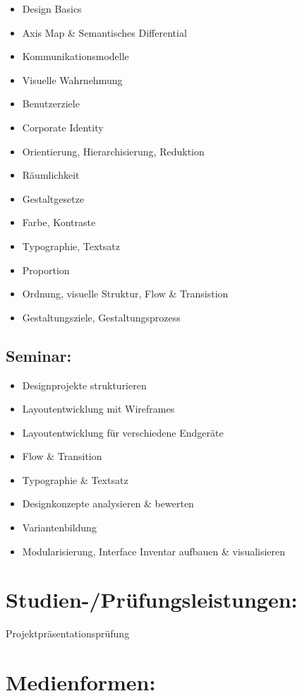 \begin{itemize}
\item
  Design Basics
\item
  Axis Map \& Semantisches Differential
\item
  Kommunikationsmodelle
\item
  Visuelle Wahrnehmung
\item
  Benutzerziele
\item
  Corporate Identity
\item
  Orientierung, Hierarchisierung, Reduktion
\item
  Räumlichkeit
\item
  Gestaltgesetze
\item
  Farbe, Kontraste
\item
  Typographie, Textsatz
\item
  Proportion
\item
  Ordnung, visuelle Struktur, Flow \& Transistion
\item
  Gestaltungsziele, Gestaltungsprozess
\end{itemize}

\subsection*{Seminar:}\label{seminar}

\begin{itemize}
\item
  Designprojekte strukturieren
\item
  Layoutentwicklung mit Wireframes
\item
  Layoutentwicklung für verschiedene Endgeräte
\item
  Flow \& Transition
\item
  Typographie \& Textsatz
\item
  Designkonzepte analysieren \& bewerten
\item
  Variantenbildung
\item
  Modularisierung, Interface Inventar aufbauen \& visualisieren
\end{itemize}

\section*{Studien-/Prüfungsleistungen:}\label{studien-pruxfcfungsleistungen-19}

Projektpräsentationsprüfung

\section*{Medienformen:}\label{medienformen-12}

